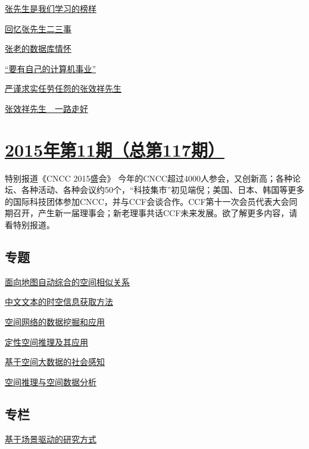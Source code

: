 \documentclass[a4paper]{article}
\begin{document}
\href{http://history.ccf.org.cn/resources/1190201776262/2015/12/11/6.pdf}{张先生是我们学习的榜样}

\href{http://history.ccf.org.cn/resources/1190201776262/2015/12/11/3.pdf}{回忆张先生二三事}

\href{http://history.ccf.org.cn/resources/1190201776262/2015/12/11/7.pdf}{张老的数据库情怀}

\href{http://history.ccf.org.cn/resources/1190201776262/2015/12/11/2.pdf}{“要有自己的计算机事业”}

\href{http://history.ccf.org.cn/resources/1190201776262/2015/12/11/9.pdf}{严谨求实任劳任怨的张效祥先生}

\href{http://history.ccf.org.cn/resources/1190201776262/2015/12/11/5.pdf}{张效祥先生　一路走好}


\section{\href{http://history.ccf.org.cn/sites/ccf/jsjtbbd.jsp?contentId=2894455208267}{\textbf{2015年第11期（总第117期）}}}
特别报道《CNCC 2015盛会》
今年的CNCC超过4000人参会，又创新高；各种论坛、各种活动、各种会议约50个，“科技集市”初见端倪；美国、日本、韩国等更多的国际科技团体参加CNCC，并与CCF会谈合作。CCF第十一次会员代表大会同期召开，产生新一届理事会；新老理事共话CCF未来发展。欲了解更多内容，请看特别报道。
\subsection{专题}
\href{http://history.ccf.org.cn/resources/1190201776262/2015/11/12/7.pdf}{面向地图自动综合的空间相似关系}

\href{http://history.ccf.org.cn/resources/1190201776262/2015/11/12/5.pdf}{中文文本的时空信息获取方法}

\href{http://history.ccf.org.cn/resources/1190201776262/2015/11/12/6.pdf}{空间网络的数据挖掘和应用}

\href{http://history.ccf.org.cn/resources/1190201776262/2015/11/12/3.pdf}{定性空间推理及其应用}

\href{http://history.ccf.org.cn/resources/1190201776262/2015/11/12/4.pdf}{基于空间大数据的社会感知}

\href{http://history.ccf.org.cn/resources/1190201776262/2015/11/12/2.pdf}{空间推理与空间数据分析}

\subsection{专栏}
\href{http://history.ccf.org.cn/resources/1190201776262/2015/11/12/11.pdf}{基于场景驱动的研究方式}
\end{document}
